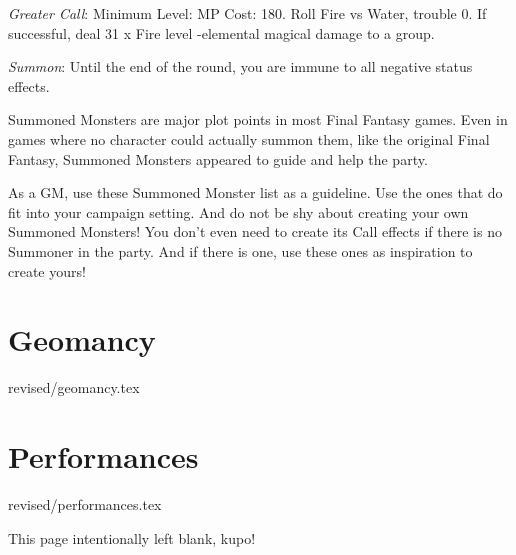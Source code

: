 \begin{multicols}{2}
    \textit{Greater Call}: Minimum Level:  MP Cost: 180. Roll Fire vs Water, trouble 0. If successful, deal 31 x Fire level -elemental magical damage to a group.
    
    \textit{Summon}: Until the end of the round, you are immune to all negative status effects.

\begin{mog}
    Summoned Monsters are major plot points in most Final Fantasy games. Even in games where no character could actually summon them, like the original Final Fantasy, Summoned Monsters appeared to guide and help the party. \pc%

    As a GM, use these Summoned Monster list as a guideline. Use the ones that do fit into your campaign setting. And do not be shy about creating your own Summoned Monsters! You don't even need to create its Call effects if there is no Summoner in the party. And if there is one, use these ones as inspiration to create yours!
\end{mog}
\end{multicols}
\clearpage
\section{Geomancy}\label{sec:magic-geomancy}
 {revised/geomancy.tex}

\section{Performances}\label{sec:magic-performances}
 {revised/performances.tex}

\clearpage
\begin{center}



    \textcolor{mogred}{\arabtype\LARGE This page intentionally left blank, kupo!}

\end{center}